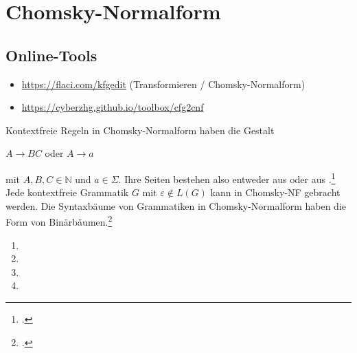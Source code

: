 \documentclass{lehramt-informatik-haupt}
\begin{document}
\let\schrittE=\liChomskyUeberErklaerung

\chapter{Chomsky-Normalform}

\begin{liQuellen}
\item \cite[Seite 35-37]{theo:fs:2}
\item \cite[Seite 179-181]{hoffmann}
\item \cite{wiki:chomsky-normalform}
\item \cite[Kapitel 19.1.3.2 Seite 590]{schneider}
\item \cite[Seite 192-194]{vossen}
\end{liQuellen}

\section{Online-Tools}

\begin{itemize}
\item \url{https://flaci.com/kfgedit} (Transformieren / Chomsky-Normalform)
\item \url{https://cyberzhg.github.io/toolbox/cfg2cnf}
\end{itemize}

\noindent
Kontextfreie Regeln in Chomsky-Normalform haben die Gestalt

\begin{center}
$A\rightarrow BC$ oder $A \rightarrow a$
\end{center}

\noindent
mit $A, B, C \in \mathbb{N}$ und $a \in \Sigma$. Ihre 
Seiten bestehen also entweder aus  oder aus .\footcite[Seite 192]{vossen}
%
Jede kontextfreie Grammatik $G$ mit $\varepsilon \notin L(G)$ kann in
Chomsky-NF gebracht werden.
%
Die Syntaxbäume von Grammatiken in Chomsky-Normalform haben
die Form von Binärbäumen.\footcite[Seite 35]{theo:fs:2}

\begin{enumerate}
\item \schrittE{1}

\item \schrittE{2}

\item \schrittE{3}

\item \schrittE{4}
\end{enumerate}

\literatur
\end{document}
